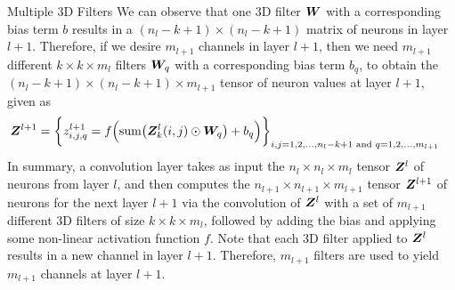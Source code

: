 \begin{frame}{Multiple 3D Filters}
We can observe that one 3D filter ${\boldsymbol W}$ with a corresponding bias
term $b$ results in a $(n_l-k+1) \times (n_l-k+1)$ matrix of
neurons in layer $l+1$. Therefore, if we desire $m_{l+1}$ channels
in layer $l+1$, then we need $m_{l+1}$ different $k \times k \times m_l$ 
filters ${\boldsymbol W}_q$ with a corresponding bias term $b_q$, to
obtain the $(n_l-k+1) \times (n_l-k+1) \times m_{l+1}$ tensor of neuron
values at layer $l+1$, given as
\begin{align*}
    {\boldsymbol Z}^{l+1} & = \biggl\{ z^{l+1}_{i,j,q} 
    = f\Bigl(\operatorname*{sum}\bigl( {\boldsymbol Z}^l_k(i,j) \odot {\boldsymbol W}_q \bigr)
        + b_q
\Bigr) \biggr\}_{i,j=1,2,\ldots, n_l-k+1 \text{ and } q = 1,2, \ldots, m_{l+1}}
\end{align*}
%
In summary, a convolution layer takes as input the $n_l \times n_l
\times m_l$ tensor ${\boldsymbol Z}^l$ of neurons from layer $l$, 
and then computes the $n_{l+1} \times n_{l+1} \times m_{l+1}$ tensor
${\boldsymbol Z}^{l+1}$ of
neurons for the next layer $l+1$ via
the convolution of ${\boldsymbol Z}^l$ with a set of $m_{l+1}$ different 3D filters of size $k
\times k \times m_l$, followed by adding the bias and applying some
non-linear activation function $f$. Note that each 3D filter applied to
${\boldsymbol Z}^l$ results in a new channel in layer $l+1$. Therefore, $m_{l+1}$
filters are used to yield $m_{l+1}$ channels at layer $l+1$.
\end{frame}
%
%
